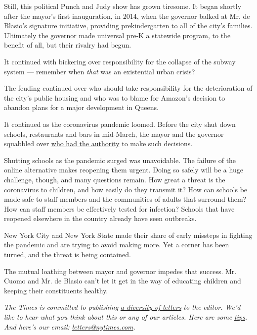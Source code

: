 Still, this political Punch and Judy show has grown tiresome. It began
shortly after the mayor's first inauguration, in 2014, when the governor
balked at Mr. de Blasio's signature initiative, providing
prekindergarten to all of the city's families. Ultimately the governor
made universal pre-K a statewide program, to the benefit of all, but
their rivalry had begun.

It continued with bickering over responsibility for the collapse of the
subway system --- remember when \emph{that} was an existential urban
crisis?

The feuding continued over who should take responsibility for the
deterioration of the city's public housing and who was to blame for
Amazon's decision to abandon plans for a major development in Queens.

It continued as the coronavirus pandemic loomed. Before the city shut
down schools, restaurants and bars in mid-March, the mayor and the
governor squabbled over
\href{https://www.nytimes.com/2020/03/17/nyregion/coronavirus-nyc-shelter-in-place.html}{who
had the authority} to make such decisions.

Shutting schools as the pandemic surged was unavoidable. The failure of
the online alternative makes reopening them urgent. Doing so safely will
be a huge challenge, though, and many questions remain. How great a
threat is the coronavirus to children, and how easily do they transmit
it? How can schools be made safe to staff members and the communities of
adults that surround them? How can staff members be effectively tested
for infection? Schools that have reopened elsewhere in the country
already have seen outbreaks.

New York City and New York State made their share of early missteps in
fighting the pandemic and are trying to avoid making more. Yet a corner
has been turned, and the threat is being contained.

The mutual loathing between mayor and governor impedes that success. Mr.
Cuomo and Mr. de Blasio can't let it get in the way of educating
children and keeping their constituents healthy.

\emph{The Times is committed to publishing}
\href{https://www.nytimes.com/2019/01/31/opinion/letters/letters-to-editor-new-york-times-women.html}{\emph{a
diversity of letters}} \emph{to the editor. We'd like to hear what you
think about this or any of our articles. Here are some}
\href{https://help.nytimes.com/hc/en-us/articles/115014925288-How-to-submit-a-letter-to-the-editor}{\emph{tips}}\emph{.
And here's our email:}
\href{mailto:letters@nytimes.com}{\emph{letters@nytimes.com}}\emph{.}

